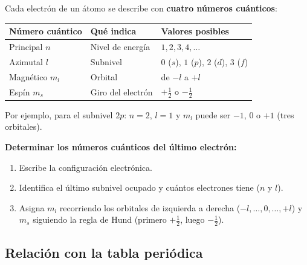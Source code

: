 \documentclass[12pt, letterpaper]{article}
\begin{document}
\begin{cuadroteoria}
  Cada electrón de un átomo se describe con \textbf{cuatro números cuánticos}:
  \begin{center}
    \begin{tabular}{lll}
      \toprule
      Número cuántico & Qué indica        & Valores posibles                           \\
      \midrule
      Principal $n$   & Nivel de energía  & $1, 2, 3, 4, \ldots$                       \\
      Azimutal $l$    & Subnivel          & $0$ ($s$), $1$ ($p$), $2$ ($d$), $3$ ($f$) \\
      Magnético $m_l$ & Orbital           & de $-l$ a $+l$                             \\
      Espín $m_s$     & Giro del electrón & $+\tfrac{1}{2}$ o $-\tfrac{1}{2}$          \\
      \bottomrule
    \end{tabular}
  \end{center}
  Por ejemplo, para el subnivel $2p$: $n = 2$, $l = 1$ y $m_l$ puede ser $-1$, $0$ o $+1$ (tres orbitales).
\end{cuadroteoria}

\begin{cuadropasos}
  \textbf{Determinar los números cuánticos del último electrón:}
  \begin{enumerate}[leftmargin=*]
    \item Escribe la configuración electrónica.
    \item Identifica el último subnivel ocupado y cuántos electrones tiene ($n$ y $l$).
    \item Asigna $m_l$ recorriendo los orbitales de izquierda a derecha ($-l, \ldots, 0, \ldots, +l$) y $m_s$ siguiendo la regla de Hund (primero $+\tfrac{1}{2}$, luego $-\tfrac{1}{2}$).
  \end{enumerate}
\end{cuadropasos}

\subsection{Relación con la tabla periódica}
\end{document}
